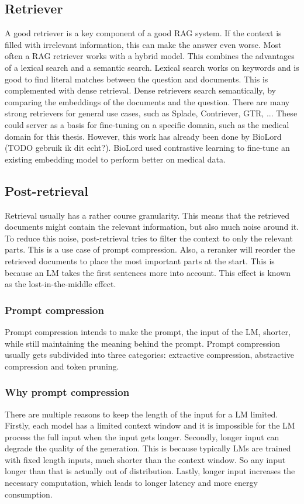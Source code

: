 \subsection{Retriever}
A good retriever is a key component of a good RAG system. If the context is filled with irrelevant information, this can make the answer even worse. Most often a RAG retriever works with a hybrid model. This combines the advantages of a lexical search and a semantic search. Lexical search works on keywords and is good to find literal matches between the question and documents. This is complemented with dense retrieval. Dense retrievers search semantically, by comparing the embeddings of the documents and the question. There are many strong retrievers for general use cases, such as Splade, Contriever, GTR, ... These could server as a basis for fine-tuning on a specific domain, such as the medical domain for this thesis. However, this work has already been done by BioLord (TODO gebruik ik dit echt?). BioLord used contrastive learning to fine-tune an existing embedding model to perform better on medical data.

\subsection{Post-retrieval}
Retrieval usually has a rather course granularity. This means that the retrieved documents might contain the relevant information, but also much noise around it. To reduce this noise, post-retrieval tries to filter the context to only the relevant parts. This is a use case of prompt compression. Also, a reranker will reorder the retrieved documents to place the most important parts at the start. This is because an LM takes the first sentences more into account. This effect is known as the lost-in-the-middle effect.
 
\subsubsection{Prompt compression}
Prompt compression intends to make the prompt, the input of the LM, shorter, while still maintaining the meaning behind the prompt. Prompt compression usually gets subdivided into three categories: extractive compression, abstractive compression and token pruning.
\subsubsection{Why prompt compression}
There are multiple reasons to keep the length of the input for a LM limited. Firstly, each model has a limited context window and it is impossible for the LM process the full input when the input gets longer. Secondly, longer input can degrade the quality of the generation. This is because typically LMs are trained with fixed length inputs, much shorter than the context window. So any input longer than that is actually out of distribution. Lastly, longer input increases the necessary computation, which leads to longer latency and more energy consumption.
